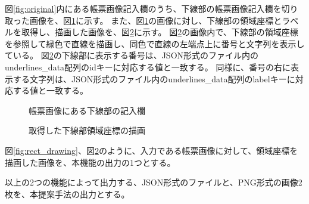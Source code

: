 図\ref{fig:original}内にある帳票画像記入欄のうち、下線部の帳票画像記入欄を切り取った画像を、図\ref{fig:underline_original}に示す。
また、図\ref{fig:underline_original}の画像に対し、下線部の領域座標とラベルを取得し、描画した画像を、図\ref{fig:underline_drawing}に示す。
図\ref{fig:underline_drawing}の画像内で、下線部の領域座標を参照して緑色で直線を描画し、同色で直線の左端点上に番号と文字列を表示している。
図\ref{fig:underline_drawing}の下線部に表示する番号は、JSON形式のファイル内のunderlines\_data配列のidキーに対応する値と一致する。
同様に、番号の右に表示する文字列は、JSON形式のファイル内のunderlines\_data配列のlabelキーに対応する値と一致する。

\begin{figure}[t]
    \begin{center}
        \caption{帳票画像にある下線部の記入欄}
        \label{fig:underline_original}
    \end{center}
\end{figure}

\begin{figure}[t]
    \begin{center}
        \caption{取得した下線部領域座標の描画}
        \label{fig:underline_drawing}
    \end{center}
\end{figure}

図\ref{fig:rect_drawing}、図\ref{fig:underline_drawing}のように、入力である帳票画像に対して、領域座標を描画した画像を、本機能の出力の1つとする。

以上の2つの機能によって出力する、JSON形式のファイルと、PNG形式の画像2枚を、本提案手法の出力とする。

